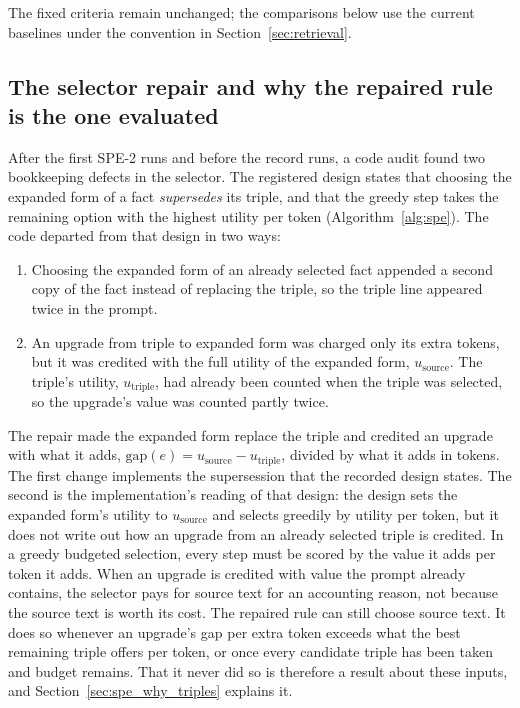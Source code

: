 The fixed criteria remain unchanged; the comparisons below use the current baselines
under the convention in Section~\ref{sec:retrieval}.

\subsection{The selector repair and why the repaired rule is the one evaluated}
\label{sec:spe_repair}

After the first SPE-2 runs and before the record runs, a code audit found two bookkeeping defects in
the selector. The registered design states that choosing the expanded
form of a fact \emph{supersedes} its triple, and that the greedy step takes the remaining option with
the highest utility per token (Algorithm~\ref{alg:spe}). The code departed from that design in two ways:
\begin{enumerate}
  \item Choosing the expanded form of an already selected fact appended a second copy of the fact
        instead of replacing the triple, so the triple line appeared twice in the prompt.
  \item An upgrade from triple to expanded form was charged only its extra tokens, but it was
        credited with the full utility of the expanded form, $u_{\text{source}}$. The triple's
        utility, $u_{\text{triple}}$, had already been counted when the triple was selected, so
        the upgrade's value was counted partly twice.
\end{enumerate}
The repair made the expanded form replace the triple and credited an upgrade with what it adds,
$\text{gap}(e) = u_{\text{source}} - u_{\text{triple}}$, divided by what it adds in tokens. The
first change implements the supersession that the recorded design states. The second is the
implementation's reading of that design: the design sets the expanded form's utility to
$u_{\text{source}}$ and selects greedily by utility per token, but it does not write out how an
upgrade from an already selected triple is credited. In a greedy
budgeted selection, every step must be scored by the value it adds per token it adds. When an
upgrade is credited with value the prompt already contains, the selector pays for source text for
an accounting reason, not because the source text is worth its cost. The repaired rule can still
choose source text. It does so whenever an upgrade's gap per extra token exceeds what the best
remaining triple offers per token, or once every candidate triple has been taken and budget remains.
That it never did so is therefore a result about these inputs, and Section~\ref{sec:spe_why_triples}
explains it.

